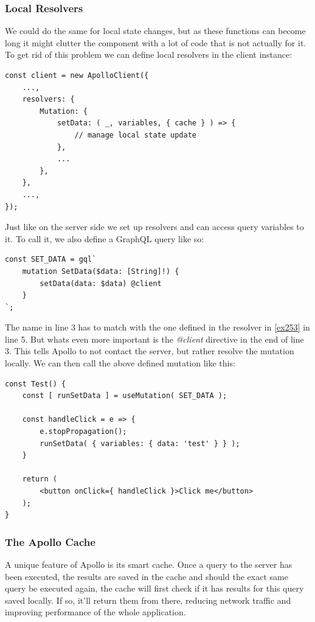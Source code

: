 \subsubsection{Local Resolvers}
We could do the same for local state changes, but as these functions can become long it might clutter the component with a lot of code that is not actually for it. To get rid of this problem we can define local resolvers in the client instance:
\begin{lstlisting}[caption={Local Resolvers},label={ex253}]
const client = new ApolloClient({
	...,
	resolvers: {
		Mutation: {
			setData: ( _, variables, { cache } ) => {
				// manage local state update			
			},
			...		
		},	
	},
	...,
});
\end{lstlisting}

Just like on the server side we set up resolvers and can access query variables to it. To call it, we also define a GraphQL query like so:
\lstset{language=GraphQL}
\begin{lstlisting}[caption={Query Definition for a Mutation in the Client}]
const SET_DATA = gql`
	mutation SetData($data: [String]!) {
		setData(data: $data) @client	
	}
`;
\end{lstlisting}
The name in line 3 has to match with the one defined in the resolver in \autoref{ex253} in line 5. But whats even more important is the \emph{@client} directive in the end of line 3. This tells Apollo to not contact the server, but rather resolve the mutation locally. We can then call the above defined mutation like this:
\lstset{language=JavaScript}
\begin{lstlisting}[caption={Using the Client Side Mutation}]
const Test() {
	const [ runSetData ] = useMutation( SET_DATA );
	
	const handleClick = e => {
		e.stopPropagation();
		runSetData(	{ variables: { data: 'test' } } );
	}
	
	return (
		<button onClick={ handleClick }>Click me</button>
	);
}
\end{lstlisting}

\subsubsection{The Apollo Cache}
A unique feature of Apollo is its smart cache. Once a query to the server has been executed, the results are saved in the cache and should the exact same query be executed again, the cache will first check if it has results for this query saved locally. If so, it'll return them from there, reducing network traffic and improving performance of the whole application. 

